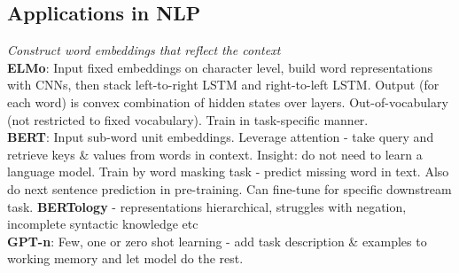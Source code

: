 \subsection*{Applications in NLP}
\textit{Construct word embeddings that reflect the context}\\
\textbf{ELMo}: Input fixed embeddings on character level, build word representations with CNNs, then stack left-to-right LSTM and right-to-left LSTM. Output (for each word) is convex combination of hidden states over layers. Out-of-vocabulary (not restricted to fixed vocabulary). Train in task-specific manner.\\
\textbf{BERT}: Input sub-word unit embeddings. Leverage attention - take query and retrieve keys \& values from words in context. Insight: do not need to learn a language model. Train by word masking task - predict missing word in text. Also do next sentence prediction in pre-training. Can fine-tune for specific downstream task. \textbf{BERTology} -  representations hierarchical, struggles with negation, incomplete syntactic knowledge etc\\
\textbf{GPT-n}: Few, one or zero shot learning - add task description \& examples to working memory and let model do the rest.